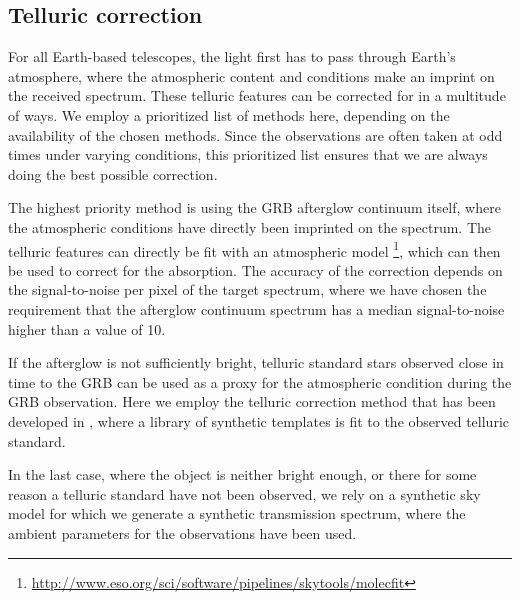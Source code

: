 \documentclass[longauth]{aa}    %
\begin{document}
\subsection{Telluric correction} \label{tell_corr}

For all Earth-based telescopes, the light first has to pass through Earth's
atmosphere, where the atmospheric content and conditions make an imprint on the
received spectrum. These telluric features can be corrected for in a multitude
of ways. We employ a prioritized list of methods here, depending on the
availability of the chosen methods. Since the observations are often taken at
odd times under varying conditions, this prioritized list ensures that we are
always doing the best possible correction.

The highest priority method is using the GRB afterglow continuum itself, where
the atmospheric conditions have directly been imprinted on the spectrum. The
telluric features can directly be fit with an atmospheric model \citep[\texttt{Molecfit};][]{Smette2015,
	Kausch2015}\footnote{\url{http://www.eso.org/sci/software/pipelines/skytools/molecfit}}, which can then be used to correct for the absorption. The accuracy of the correction depends on the signal-to-noise per pixel of the target spectrum, where we have chosen the requirement that the afterglow continuum spectrum has a median signal-to-noise higher than a value of 10.

If the afterglow is not sufficiently bright, telluric standard stars observed
close in time to the GRB can be used as a proxy for the atmospheric
condition during the GRB observation. Here we employ the telluric correction
method that has been developed in \citet{Selsing2015}, where a library of
synthetic templates is fit to the observed telluric standard.

In the last case, where the object is neither bright enough, or there for some
reason a telluric standard have not been observed, we rely on a synthetic sky
model \citep{Noll2012, Jones2013} for which we generate a
synthetic transmission spectrum, where the ambient parameters for the
observations have been used.
\end{document}
